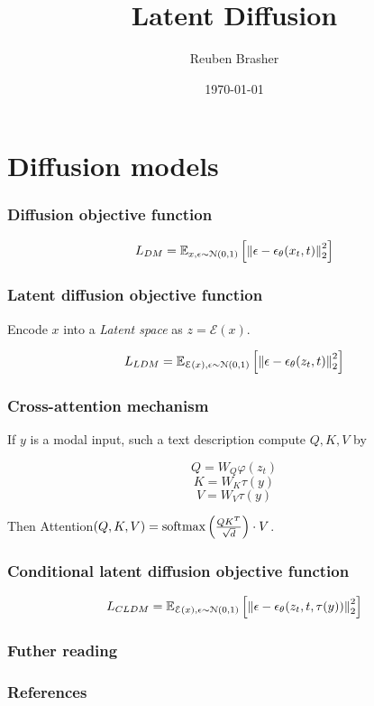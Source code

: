 \documentclass{beamer}
\title{Latent Diffusion}
\author{Reuben Brasher}
\date{\today}
\begin{document}
\frame{\titlepage}

\section[Outline]{}
\frame{\tableofcontents}

\section{Diffusion models}

\frame
{
   \frametitle{Diffusion objective function}

   $$L_{DM} = \mathbb{E}_{x,\epsilon \sim \mathcal{N}(0,1)} \left[{\left\|{\epsilon - \epsilon_\theta(x_t,t)}\right\|^2_2}\right]$$
}

\frame
{
   \frametitle{Latent diffusion objective function}

   Encode $x$ into a \textit{Latent space} as $z = \mathcal{E} (x)$.

   $$L_{LDM} = \mathbb{E}_{\mathcal{E}(x),\epsilon \sim \mathcal{N}(0,1)} \left[{\left\|{\epsilon - \epsilon_\theta(z_t,t)}\right\|^2_2}\right]$$
}

\frame
{
   \frametitle{Cross-attention mechanism}

   If $y$ is a modal input, such a text description compute $Q,K,V$ by

   $$Q=W_Q \varphi(z_t)$$
   $$K=W_K \tau(y)$$
   $$V=W_V \tau(y)$$

   Then Attention$(Q,K,V)=\operatorname{softmax} \left({\frac{QK^T}{\sqrt{d}}}\right) \cdot V$.
}

\frame
{
   \frametitle{Conditional latent diffusion objective function}

   $$L_{CLDM} = \mathbb{E}_{\mathcal{E}(x),\epsilon \sim \mathcal{N}(0,1)} \left[{\left\|{\epsilon - \epsilon_\theta(z_t,t,\tau(y))}\right\|^2_2}\right]$$
}


\frame
{
   \frametitle{Futher reading}
   \cite{rombach2022high}
   
   \cite{zhang2023adding}
}

\begin{frame}[t,allowframebreaks]
\frametitle{References}
\printbibliography
\end{frame}
\end{document}
